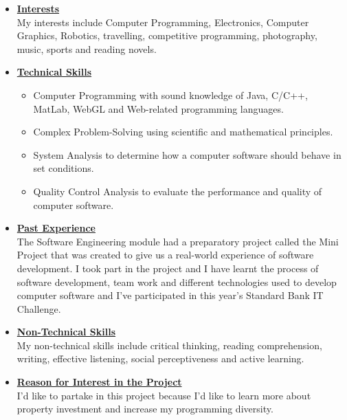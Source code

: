 \documentclass[a4paper,12pt]{article}
\begin{document}
\begin{itemize}
\item {\large \underline{\textbf{Interests}}}\\[0.2cm]
My interests include Computer Programming, Electronics, Computer Graphics, Robotics, travelling, competitive programming, photography, music, sports and reading novels.
\\
\item {\large \underline{\textbf{Technical Skills}}}

	\begin{itemize}
		\item Computer Programming with sound knowledge of Java, C/C++, MatLab, WebGL and Web-related 					programming languages.
		\item Complex Problem-Solving using scientific and mathematical principles.
		\item System Analysis to determine how a computer software should behave in set conditions.
		\item Quality Control Analysis to evaluate the performance and quality of computer software.
	\end{itemize}
\bigskip
\item {\large \underline{\textbf{Past Experience}}}\\[0.2cm]
The Software Engineering module had a preparatory project called the Mini Project that was created to give us a real-world experience of software development. I took part in the project and I have learnt the process of software development, team work and different technologies used to develop computer software and I've participated in this year's Standard Bank IT Challenge. 
\\
\item {\large \underline{\textbf{Non-Technical Skills}}}\\[0.2cm]
My non-technical skills include critical thinking, reading comprehension, writing, effective listening, social perceptiveness and active learning. 

\newpage
\item {\large \underline{\textbf{Reason for Interest in the Project}}}\\[0.2cm]
I'd like to partake in this project because I'd like to learn more about property investment and increase my programming diversity.

\end{itemize}

\newpage
\end{document}
